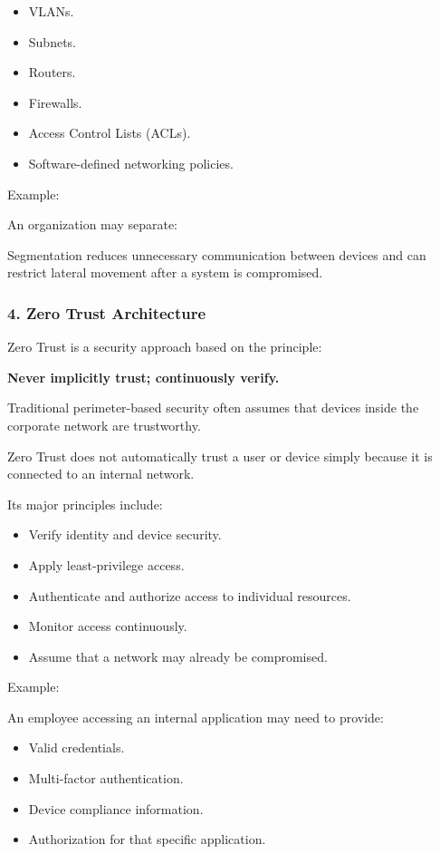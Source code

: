 \begin{itemize}
\item VLANs.
\item Subnets.
\item Routers.
\item Firewalls.
\item Access Control Lists (ACLs).
\item Software-defined networking policies.
\end{itemize}

Example:

An organization may separate:


Segmentation reduces unnecessary communication between devices and can restrict lateral movement after a system is compromised.

\subsubsection{4. Zero Trust Architecture}

Zero Trust is a security approach based on the principle:

\textbf{Never implicitly trust; continuously verify.}

Traditional perimeter-based security often assumes that devices inside the corporate network are trustworthy.

Zero Trust does not automatically trust a user or device simply because it is connected to an internal network.

Its major principles include:

\begin{itemize}
\item Verify identity and device security.
\item Apply least-privilege access.
\item Authenticate and authorize access to individual resources.
\item Monitor access continuously.
\item Assume that a network may already be compromised.
\end{itemize}

Example:

An employee accessing an internal application may need to provide:

\begin{itemize}
\item Valid credentials.
\item Multi-factor authentication.
\item Device compliance information.
\item Authorization for that specific application.
\end{itemize}

